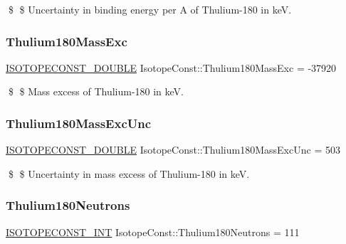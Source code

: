 \$ \$ Uncertainty in binding energy per A of Thulium-\/180 in keV. \mbox{\label{group___isotope_const-_thulium-_tm180_ga1391e4683bd75735f4ec59b8a9ed36d0}} 
\subsubsection{\texorpdfstring{Thulium180\+Mass\+Exc}{Thulium180MassExc}}
{\footnotesize\ttfamily \mbox{\hyperlink{group___isotope_const-_macros_ga8f45a7272ce02c0b4c65c44636ed719a}{I\+S\+O\+T\+O\+P\+E\+C\+O\+N\+S\+T\+\_\+\+D\+O\+U\+B\+LE}} Isotope\+Const\+::\+Thulium180\+Mass\+Exc = -\/37920}

\$ \$ Mass excess of Thulium-\/180 in keV. \mbox{\label{group___isotope_const-_thulium-_tm180_ga222ad1130cd30e5d3abaf7d3bf57ac78}} 
\subsubsection{\texorpdfstring{Thulium180\+Mass\+Exc\+Unc}{Thulium180MassExcUnc}}
{\footnotesize\ttfamily \mbox{\hyperlink{group___isotope_const-_macros_ga8f45a7272ce02c0b4c65c44636ed719a}{I\+S\+O\+T\+O\+P\+E\+C\+O\+N\+S\+T\+\_\+\+D\+O\+U\+B\+LE}} Isotope\+Const\+::\+Thulium180\+Mass\+Exc\+Unc = 503}

\$ \$ Uncertainty in mass excess of Thulium-\/180 in keV. \mbox{\label{group___isotope_const-_thulium-_tm180_ga25dccaf5c4bfcd2d622b3df141aaee9d}} 
\subsubsection{\texorpdfstring{Thulium180\+Neutrons}{Thulium180Neutrons}}
{\footnotesize\ttfamily \mbox{\hyperlink{group___isotope_const-_macros_ga5f18360b3e99483a35c32d789e62621c}{I\+S\+O\+T\+O\+P\+E\+C\+O\+N\+S\+T\+\_\+\+I\+NT}} Isotope\+Const\+::\+Thulium180\+Neutrons = 111}

